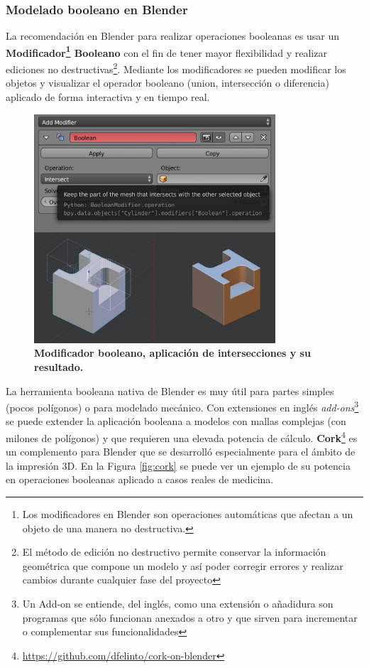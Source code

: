 \subsubsection{Modelado booleano en Blender}

La recomendación en Blender para realizar operaciones booleanas es usar un \textbf{Modificador\footnote{
Los modificadores en Blender son operaciones automáticas que afectan a un objeto de una manera no destructiva.} Booleano} con el fin de tener mayor flexibilidad y realizar ediciones no destructivas\footnote{El método de edición no destructivo permite conservar la información geométrica que compone un modelo y así poder corregir errores y realizar cambios durante cualquier fase del proyecto}. Mediante los modificadores se pueden modificar los objetos y visualizar el operador booleano (union, intersección o diferencia) aplicado de forma interactiva y en tiempo real.

\begin{figure}[h]
\includegraphics[width=9cm]{Img/Modelos/modelado22.jpg}
\centering
\caption{\textbf{ \footnotesize{Modificador booleano, aplicación de intersecciones y su resultado. }}}
\end{figure}

La herramienta booleana nativa de Blender es muy útil para partes simples (pocos polígonos) o para modelado mecánico. Con extensiones en inglés \textit{add-ons}\footnote{Un Add-on se entiende, del inglés, como una extensión o añadidura son programas que sólo funcionan anexados a otro y que sirven para incrementar o complementar sus funcionalidades} se puede extender la aplicación booleana a modelos con mallas complejas (con milones de polígonos) y que requieren una elevada potencia de cálculo.
\textbf{Cork}\footnote{\url{https://github.com/dfelinto/cork-on-blender}} es un complemento para Blender que se desarrolló especialmente para el ámbito de la impresión 3D. En la Figura \ref{fig:cork} se puede ver un ejemplo de su potencia en operaciones booleanas aplicado a casos reales de medicina.

